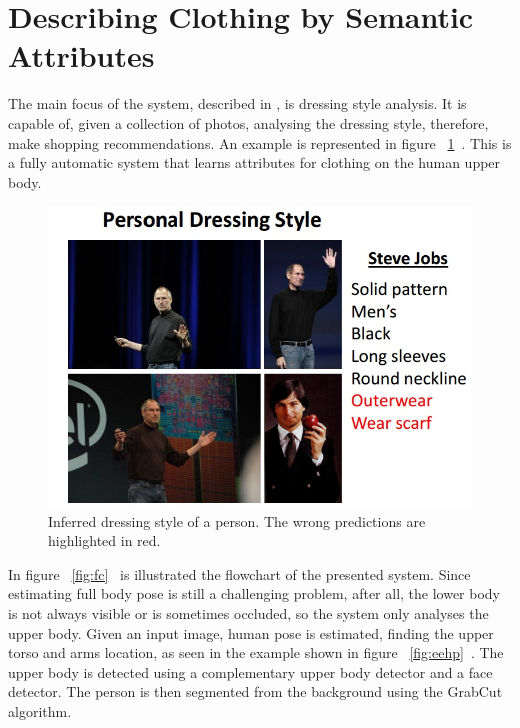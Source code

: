 \documentclass[titlepage,12pt,a4paper,times]{book}
\begin{document}
\section{Describing Clothing by Semantic Attributes}
\label{chap2:sec:art2}

The main focus of the system, described in \citep{2}, is dressing style
analysis. It is capable of, given a collection of photos, analysing the
dressing style, therefore, make shopping recommendations. An example is
represented in figure ~\ref{fig:ids}~\citep{2}. This is a fully automatic
system that learns attributes for clothing on the human upper body.

\begin{figure}[!h]
\centering
\includegraphics[scale=0.7]{images/2_3_fig0.jpg}
\caption{Inferred dressing style of a person. The wrong predictions are
highlighted in red.}
\label{fig:ids}
\end{figure}
\FloatBarrier

In figure ~\ref{fig:fc}~\citep{2} is illustrated the flowchart of the presented
system. Since estimating full body pose is still a challenging problem, after
all, the lower body is not always visible or is sometimes occluded, so the
system only analyses the upper body. Given an input image, human pose is
estimated, finding the upper torso and arms location, as seen in the example
shown in figure ~\ref{fig:eehp}~\citep{2}. The upper body is detected using a
complementary upper body detector and a face detector. The person is then
segmented from the background using the GrabCut~\citep{7} algorithm.
\end{document}
